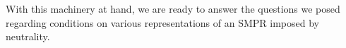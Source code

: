 \documentclass[prodmode]{acmsmall-ec14}
\newcommand{\calL}{{\mathcal{L}}}
\newcommand{\rank}{{\calL(A)}}
\begin{document}
%
With this machinery at hand, we are ready to answer the questions we posed regarding conditions on various representations of an SMPR imposed by neutrality. 
%

\end{document}
